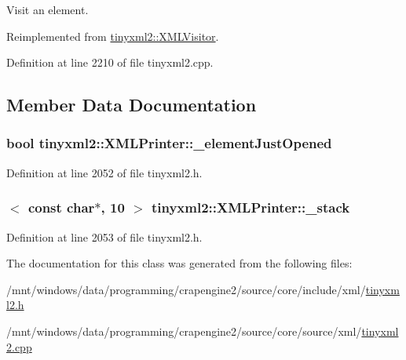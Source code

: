 Visit an element. 



Reimplemented from \hyperlink{classtinyxml2_1_1_x_m_l_visitor_a772f10ddc83f881956d32628faa16eb6}{tinyxml2\+::\+X\+M\+L\+Visitor}.



Definition at line 2210 of file tinyxml2.\+cpp.



\subsection{Member Data Documentation}
\hypertarget{classtinyxml2_1_1_x_m_l_printer_ac07169d58b465214a2b1fa306e617c26}{
\subsubsection[{\+\_\+element\+Just\+Opened}]{\setlength{\rightskip}{0pt plus 5cm}bool tinyxml2\+::\+X\+M\+L\+Printer\+::\+\_\+element\+Just\+Opened\hspace{0.3cm}{\ttfamily [protected]}}}\label{classtinyxml2_1_1_x_m_l_printer_ac07169d58b465214a2b1fa306e617c26}


Definition at line 2052 of file tinyxml2.\+h.

\hypertarget{classtinyxml2_1_1_x_m_l_printer_a99d59e67e084714541bee3ae43884bef}{
\subsubsection[{\+\_\+stack}]{$<$ const char$\ast$, 10 $>$ tinyxml2\+::\+X\+M\+L\+Printer\+::\+\_\+stack\hspace{0.3cm}{\ttfamily [protected]}}}\label{classtinyxml2_1_1_x_m_l_printer_a99d59e67e084714541bee3ae43884bef}


Definition at line 2053 of file tinyxml2.\+h.



The documentation for this class was generated from the following files\+:\begin{DoxyCompactItemize}
\item 
/mnt/windows/data/programming/crapengine2/source/core/include/xml/\hyperlink{tinyxml2_8h}{tinyxml2.\+h}\item 
/mnt/windows/data/programming/crapengine2/source/core/source/xml/\hyperlink{tinyxml2_8cpp}{tinyxml2.\+cpp}\end{DoxyCompactItemize}
